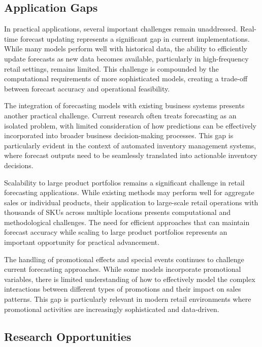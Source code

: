\documentclass[12pt,a4paper]{report}
\begin{document}
\subsection{Application Gaps}

In practical applications, several important challenges remain unaddressed. Real-time forecast updating represents a significant gap in current implementations. While many models perform well with historical data, the ability to efficiently update forecasts as new data becomes available, particularly in high-frequency retail settings, remains limited. This challenge is compounded by the computational requirements of more sophisticated models, creating a trade-off between forecast accuracy and operational feasibility.

The integration of forecasting models with existing business systems presents another practical challenge. Current research often treats forecasting as an isolated problem, with limited consideration of how predictions can be effectively incorporated into broader business decision-making processes. This gap is particularly evident in the context of automated inventory management systems, where forecast outputs need to be seamlessly translated into actionable inventory decisions.

Scalability to large product portfolios remains a significant challenge in retail forecasting applications. While existing methods may perform well for aggregate sales or individual products, their application to large-scale retail operations with thousands of SKUs across multiple locations presents computational and methodological challenges. The need for efficient approaches that can maintain forecast accuracy while scaling to large product portfolios represents an important opportunity for practical advancement.

The handling of promotional effects and special events continues to challenge current forecasting approaches. While some models incorporate promotional variables, there is limited understanding of how to effectively model the complex interactions between different types of promotions and their impact on sales patterns. This gap is particularly relevant in modern retail environments where promotional activities are increasingly sophisticated and data-driven.



\subsection{Research Opportunities}
\end{document}

